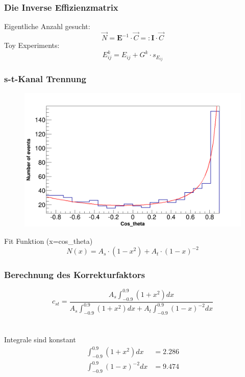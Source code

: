 \begingroup
\Large
\begin{frame}
	\frametitle{Die Inverse Effizienzmatrix}
	\hspace{2cm} Eigentliche Anzahl gesucht:
	\begin{equation*}
		\vec{N}=\boldsymbol{E}^{-1}\cdot\vec{C}=:\boldsymbol{I}\cdot\vec{C}
	\end{equation*}
	\hspace{2cm} Toy Experiments:
	\begin{equation*}
		E^{k}_{ij}=E_{ij}+G^k\cdot s_{E_{ij}}
	\end{equation*}
\end{frame}
\endgroup

\begin{frame}
	\frametitle{s-t-Kanal Trennung}
	\begin{figure}
		\centering
		\includegraphics[width=0.85\linewidth]{../results/data_results/cosp_fits/stchannelexample46.png}
	\end{figure}
	\hspace{2cm} Fit Funktion (x=cos\_theta)
	\begin{equation*}
		N(x)=A_s\cdot(1-x^2)+A_t\cdot(1-x)^{-2}
	\end{equation*}
\end{frame}

\begin{frame}
	\frametitle{Berechnung des Korrekturfaktors}
	\begin{equation*}
		c_{st}=\frac{A_s\int_{-0.9}^{0.9}(1+x^2)dx}{A_s\int_{-0.9}^{0.9}(1+x^2)dx+A_t\int_{-0.9}^{0.9}(1-x)^{-2}dx}
	\end{equation*}\\
	\hfill\\
	\hspace{2cm} Integrale sind konstant
	\begin{align*}
		\int_{-0.9}^{0.9}(1+x^2)dx&=2.286\\
		\int_{-0.9}^{0.9}(1-x)^{-2}dx&=9.474
	\end{align*}
\end{frame}


